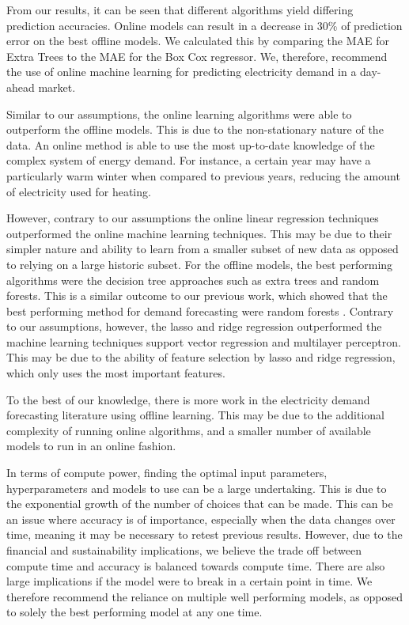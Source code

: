 \documentclass[final,3p,times,twocolumn,numbers]{elsarticle}
\begin{document}

From our results, it can be seen that different algorithms yield differing prediction accuracies. Online models can result in a decrease in 30\% of prediction error on the best offline models. We calculated this by comparing the MAE for Extra Trees to the MAE for the Box Cox regressor. We, therefore, recommend the use of online machine learning for predicting electricity demand in a day-ahead market.

Similar to our assumptions, the online learning algorithms were able to outperform the offline models. This is due to the non-stationary nature of the data. An online method is able to use the most up-to-date knowledge of the complex system of energy demand. For instance, a certain year may have a particularly warm winter when compared to previous years, reducing the amount of electricity used for heating.

However, contrary to our assumptions the online linear regression techniques outperformed the online machine learning techniques. This may be due to their simpler nature and ability to learn from a smaller subset of new data as opposed to relying on a large historic subset. For the offline models, the best performing algorithms were the decision tree approaches such as extra trees and random forests. This is a similar outcome to our previous work, which showed that the best performing method for demand forecasting were random forests \cite{Kell2018}. Contrary to our assumptions, however, the lasso and ridge regression outperformed the machine learning techniques support vector regression and multilayer perceptron. This may be due to the ability of feature selection by lasso and ridge regression, which only uses the most important features.

To the best of our knowledge, there is more work in the electricity demand forecasting literature using offline learning. This may be due to the additional complexity of running online algorithms, and a smaller number of available models to run in an online fashion.

In terms of compute power, finding the optimal input parameters, hyperparameters and models to use can be a large undertaking. This is due to the exponential growth of the number of choices that can be made. This can be an issue where accuracy is of importance, especially when the data changes over time, meaning it may be necessary to retest previous results. However, due to the financial and sustainability implications, we believe the trade off between compute time and accuracy is balanced towards compute time. There are also large implications if the model were to break in a certain point in time. We therefore recommend the reliance on multiple well performing models, as opposed to solely the best performing model at any one time. 
\end{document}
